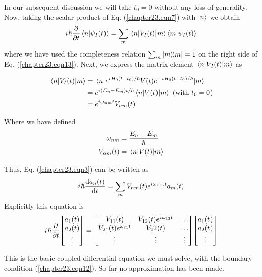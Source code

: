 In our subsequent discussion we will take $t_0 = 0$ without any loss of generality. Now, taking the scalar product of Eq. (\ref{chapter23.eqn7}) with $\ket{n}$ we obtain
\begin{equation}
\label{chapter23.eqn13}
{i\mkern1mu} \hbar \pdv{}{t} \braket{n}{\psi_I(t)} = \sum_{m} \mel{n}{V_I(t)}{m} \braket{m}{\psi_I(t)}
\end{equation}
where we have used the completeness relation $\sum_{m} \ketbra{m}{m} = 1$ on the right side of Eq. (\ref{chapter23.eqn13}). Next, we express the matrix element $\mel{n}{V_I(t)}{m}$ as

\begin{align}
\mel{n}{V_I(t)}{m} 
&= \mel{n}{e^{{i\mkern1mu}H_0 (t-t_0)/\hbar} V(t) e^{-{i\mkern1mu}H_0 (t-t_0)/\hbar}}{m} \nonumber\\
&= e^{{i\mkern1mu} (E_n - E_m) t/\hbar} \mel{n}{V(t)}{m} \ (\text{with } t_0 = 0) \nonumber\\
&= e^{{i\mkern1mu} \omega_{n m} t} V_{n m}(t)
\label{chapter23.eqn14}
\end{align}

Where we have defined
\begin{align}
\label{chapter23.eqn15}
\omega_{n m} &= \frac{E_n - E_m}{\hbar} \\
\label{chapter23.eqn16}
V_{n m}(t) &= \mel{n}{V(t)}{m}
\end{align}

Thus, Eq. (\ref{chapter23.eqn3}) can be written as
\begin{equation}
\label{chapter23.eqn17}
{i\mkern1mu} \hbar \dv{a_n(t)}{t} = \sum_{m} V_{n m}(t) e^{{i\mkern1mu} \omega_{n m} t} a_m(t)
\end{equation}
Explicitly this equation is
\begin{equation}
\label{chapter23.eqn18}
\iu \hbar \pdv{}{t}
\mqty[a_1(t) \\ a_2(t) \\ \vdots] = 
\mqty[V_{11}(t) & V_{12}(t) e^{\iu\omega_{12}t} & \ldots\\
V_{21}(t)e^{\omega_{21}t} & V_22(t) & \ldots \\
\vdots & \vdots & \vdots
]
\mqty[a_1(t) \\ a_2(t) \\ \vdots]
\end{equation}

This is the basic coupled differential equation we must solve, with the boundary condition (\ref{chapter23.eqn12}). So far no approximation has been made.


